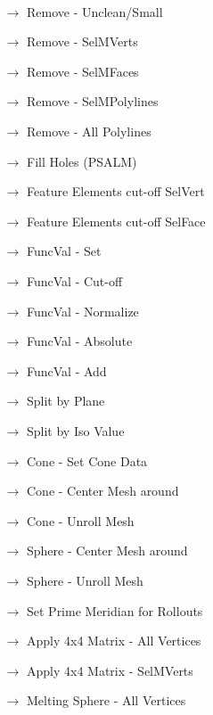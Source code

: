 {\tt
\begin{itemize}
\item[] 
 \begin{itemize}
 \item[$\rightarrow$] Remove - Unclean/Small
 \item[$\rightarrow$] Remove - SelMVerts
 \item[$\rightarrow$] Remove - SelMFaces
 \item[$\rightarrow$] Remove - SelMPolylines
  \color{gray}
 \item[$\rightarrow$] Remove - All Polylines
 \color{black}
 \item[$\rightarrow$] Fill Holes (PSALM)   
 \item[$\rightarrow$] Feature Elements cut-off SelVert
 \color{gray}
 \item[$\rightarrow$] Feature Elements cut-off SelFace 
 \color{black}
 \item[$\rightarrow$] FuncVal - Set
 \item[$\rightarrow$] FuncVal - Cut-off
 \item[$\rightarrow$] FuncVal - Normalize
 \item[$\rightarrow$] FuncVal - Absolute
 \item[$\rightarrow$] FuncVal - Add
 \item[$\rightarrow$] Split by Plane
 \item[$\rightarrow$] Split by Iso Value
 \item[$\rightarrow$] Cone - Set Cone Data
 \item[$\rightarrow$] Cone - Center Mesh around
 \item[$\rightarrow$] Cone - Unroll Mesh
 \item[$\rightarrow$] Sphere - Center Mesh around
 \item[$\rightarrow$] Sphere - Unroll Mesh
 \item[$\rightarrow$] Set Prime Meridian for Rollouts
 \item[$\rightarrow$] Apply 4x4 Matrix - All Vertices
 \item[$\rightarrow$] Apply  4x4 Matrix - SelMVerts
 \item[$\rightarrow$] Melting Sphere - All Vertices
 \end{itemize}
 \end{itemize}
 }

 

